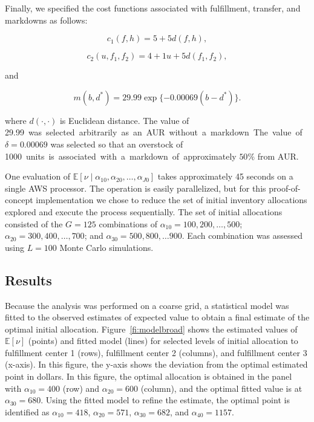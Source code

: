 \documentclass[11pt, oneside]{article}   	%
\begin{document}
Finally, we specified the cost functions associated with fulfillment, transfer, and markdowns as follows:

$$c_1 (f, h) = 5 + 5 d(f, h),$$

$$c_2 (u, f_1, f_2) = 4 + 1 u + 5 d(f_1, f_2),$$

\noindent and

$$m (b, d^*) = 29.99 \exp \{- 0.00069 (b - d^*) \}.$$

\noindent where $d(\cdot, \cdot)$ is Euclidean distance.  The value of \SI{29.99} was selected arbitrarily as an AUR without a markdown.  The value of $\delta = 0.00069$ was selected so that an overstock of \SI{1000} units is associated with a markdown of approximately $50\%$ from AUR.

One evaluation of $\mathbb{E}[\nu \mid \alpha_{10}, \alpha_{20}, \ldots, \alpha_{J0}]$ takes approximately 45 seconds on a single AWS processor.  The operation is easily parallelized, but for this proof-of-concept implementation we chose to reduce the set of initial inventory allocations explored and execute the process sequentially.  The set of initial allocations consisted of the $G = 125$ combinations of $\alpha_{10} = 100, 200, \dots, 500$; $\alpha_{20} = 300, 400, \dots, 700$; and $\alpha_{30} = 500, 800, \ldots 900$.  Each combination was assessed using $L = 100$ Monte Carlo simulations.

\subsection{Results}

Because the analysis was performed on a coarse grid, a statistical model was fitted to the observed estimates of expected value to obtain a final estimate of the optimal initial allocation.  Figure~\ref{fi:modelbroad} shows the estimated values of $\mathbb{E}[\nu]$ (points) and fitted model (lines) for selected levels of initial allocation to fulfillment center 1 (rows), fulfillment center 2 (columns), and fulfillment center 3 (x-axis).  In this figure, the y-axis shows the deviation from the optimal estimated point in dollars.  In this figure, the optimal allocation is obtained in the panel with $\alpha_{10} = 400$ (row) and $\alpha_{20} = 600$ (column), and the optimal fitted value is at $\alpha_{30} = 680$.  Using the fitted model to refine the estimate, the optimal point is identified as $\alpha_{10} = 418$, $\alpha_{20} = 571$, $\alpha_{30} = 682$, and $\alpha_{40} = 1157$.
\end{document}
